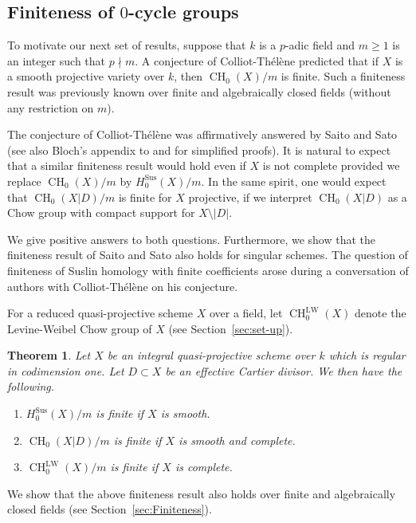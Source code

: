 \documentclass[11pt]{article}
\numberwithin{equation}{section}
\newcommand{\LW}{\mathrm{LW}}
\newcommand{\sus}{\mathrm{Sus}}
\newtheorem{thm}{Theorem}[section]
\theoremstyle{definition}
\newcommand{\secref}{Section~\ref}
\DeclareMathOperator{\CH}{CH}
\begin{document}
\subsection{Finiteness of $0$-cycle groups}\label{sec:FF}
To motivate our next set of results, suppose that
$k$ is a $p$-adic field and $m \ge 1$ is an integer such that $p \nmid m$. A
conjecture of Colliot-Thélène predicted that if $X$ is a smooth projective
variety over $k$, then ${\CH_0(X)}/m$ is finite.
Such a finiteness result was previously known over finite and algebraically closed
fields (without any restriction on $m$).

The conjecture of Colliot-Thélène was affirmatively answered by
Saito and Sato~\cite{SaitoSatoAnnals} (see also Bloch's appendix to
\cite{EsnaultWittenberg} and
\cite{EKW} for simplified proofs).
It is natural to expect that a similar finiteness result would hold even if
$X$ is not complete provided we replace
${\CH_0(X)}/m$ by ${H^{\sus}_0(X)}/m$.
In the same spirit, one would expect that ${\CH_0(X|D)}/m$ is finite for $X$
projective, if we interpret ${\CH_0(X|D)}$ as a Chow group with compact support for
$X \setminus |D|$.

We give positive answers to both questions. Furthermore, we show that the finiteness
result of Saito and Sato also holds for singular schemes.
The question of finiteness of Suslin homology with finite coefficients arose during a
conversation of authors with Colliot-Thélène on his
conjecture.

For a reduced quasi-projective scheme $X$ over a field, let $\CH^{\LW}_0(X)$ denote the
Levine-Weibel Chow group of $X$ (see \secref{sec:set-up}).

\begin{thm}\label{thm:Main-4}
Let $X$ be an integral quasi-projective scheme over $k$ which is regular
in codimension one. Let $D \subset X$ be an effective Cartier divisor.
We then have the following.
\begin{enumerate}
\item\label{thm:Main-41}
${H^{\sus}_0(X)}/m$ is finite if $X$ is smooth.
\item\label{thm:Main-42}
${\CH_0(X|D)}/m$ is finite if $X$ is smooth and complete.
\item\label{thm:Main-43}
${\CH^{\LW}_0(X)}/m$ is finite if $X$ is complete.
\end{enumerate}
\end{thm}

We show that the above finiteness result also holds over finite and
algebraically closed fields (see \secref{sec:Finiteness}).
\end{document}
